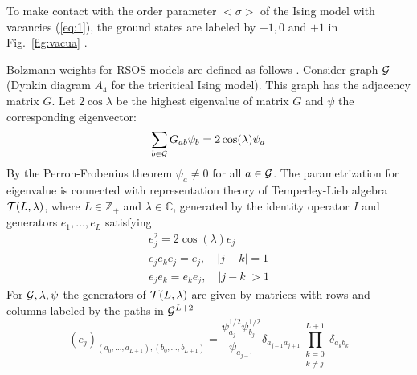 \documentclass[12pt]{article}
\begin{document}
To make contact with the order parameter $<\sigma>$ of the Ising model
with vacancies (\ref{eq:1}),  the ground states are labeled by $-1, 0$
and $+1$ in Fig.~\ref{fig:vacua} \cite{chim1996boundary}.

Bolzmann weights for RSOS models are defined as follows \cite{behrend2001integrable}. Consider
graph ${\cal G}$ (Dynkin diagram $A_4$ for the tricritical Ising
model). This graph has the adjacency matrix $G$. Let $2\cos\lambda$ be the
highest eigenvalue of matrix $G$ and $\psi$ the corresponding eigenvector:
\begin{equation}
  \label{eq:2}
  \sum_{b\in {\cal G}} G_{ab}\psi_b = 2\cos(\lambda) \psi_a
\end{equation}
By the Perron-Frobenius theorem $\psi_a \neq 0$ for all $a\in {\cal
  G}$. 
The parametrization for eigenvalue is connected with
representation theory of Temperley-Lieb algebra ${\cal T}(L,\lambda)$,
where $L\in \mathbb{Z}_+$ and $\lambda\in\mathbb{C}$, generated by the
identity operator $I$ and generators $e_1,\dots, e_L$ satisfying
\begin{equation}
  \label{eq:3}
  \begin{array}{l}
    e_j^2 = 2\cos(\lambda) e_j\\
    e_j e_k e_j = e_j, \quad |j-k|=1\\
    e_j e_k = e_k e_j , \quad |j-k|>1
  \end{array}
\end{equation}
For ${\cal G}, \lambda, \psi$ the generators of ${\cal T}(L,\lambda)$
are given by matrices with rows and columns labeled by the paths in ${\cal G}^{L+2}$
\begin{equation}
  \label{eq:4}
  \left(e_j\right)_{(a_0,\dots, a_{L+1}),(b_0,\dots,
    b_{L+1})}=\frac{\psi^{1/2}_{a_j} \psi^{1/2}_{b_j}}{\psi_{a_{j-1}}}
  \delta_{a_{j-1} a_{j+1}} \prod_{\substack{k=0\\k\neq j}}^{L+1}\delta_{a_k b_k}
\end{equation}
\end{document}
